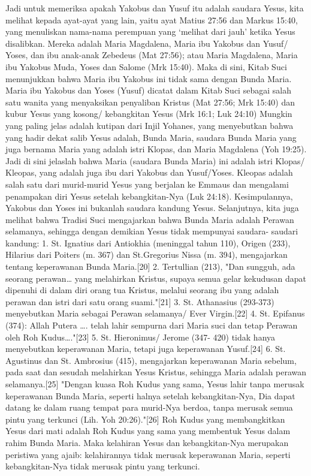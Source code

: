 Jadi untuk memeriksa apakah Yakobus dan Yusuf itu adalah saudara Yesus, kita melihat kepada ayat-ayat yang lain, yaitu ayat Matius 27:56 dan Markus 15:40, yang menuliskan nama-nama perempuan yang ‘melihat dari jauh’ ketika Yesus disalibkan. Mereka adalah Maria Magdalena, Maria ibu Yakobus dan Yusuf/ Yoses, dan ibu anak-anak Zebedeus (Mat 27:56); atau Maria Magdalena, Maria ibu Yakobus Muda, Yoses dan Salome (Mrk 15:40). Maka di sini, Kitab Suci menunjukkan bahwa Maria ibu Yakobus ini tidak sama dengan Bunda Maria. Maria ibu Yakobus dan Yoses (Yusuf) dicatat dalam Kitab Suci sebagai salah satu wanita yang menyaksikan penyaliban Kristus (Mat 27:56; Mrk 15:40) dan kubur Yesus yang kosong/ kebangkitan Yesus (Mrk 16:1; Luk 24:10)
Mungkin yang paling jelas adalah kutipan dari Injil Yohanes, yang menyebutkan bahwa yang hadir dekat salib Yesus adalah, Bunda Maria, saudara Bunda Maria yang juga bernama Maria yang adalah istri  Klopas, dan Maria Magdalena (Yoh 19:25). Jadi di sini jelaslah bahwa Maria (saudara Bunda Maria) ini adalah istri Klopas/ Kleopas, yang adalah juga ibu dari Yakobus dan Yusuf/Yoses. Kleopas adalah salah satu dari murid-murid Yesus yang berjalan ke Emmaus dan mengalami penampakan diri Yesus setelah kebangkitan-Nya (Luk 24:18).
Kesimpulannya, Yakobus dan Yoses ini bukanlah saudara kandung Yesus.
Selanjutnya, kita juga melihat bahwa Tradisi Suci mengajarkan bahwa Bunda Maria adalah Perawan selamanya, sehingga dengan demikian Yesus tidak mempunyai saudara- saudari kandung:
1.    St. Ignatius dari Antiokhia (meninggal tahun 110), Origen (233), Hilarius dari Poiters (m. 367) dan St.Gregorius Nissa (m. 394), mengajarkan tentang keperawanan Bunda Maria.[20]
2.    Tertullian (213), "Dan sungguh, ada seorang perawan… yang melahirkan Kristus, supaya semua gelar kekudusan dapat dipenuhi di dalam diri orang tua Kristus, melalui seorang ibu yang adalah perawan dan istri dari satu orang suami."[21]
3.    St. Athanasius (293-373) menyebutkan Maria sebagai Perawan selamanya/ Ever Virgin.[22]
4.    St. Epifanus (374): Allah Putera …. telah lahir sempurna dari Maria suci dan tetap Perawan oleh Roh Kudus…."[23]
5.    St. Hieronimus/ Jerome (347- 420) tidak hanya menyebutkan keperawanan Maria, tetapi juga keperawanan Yusuf.[24]
6.    St. Agustinus dan St. Ambrosius (415), mengajarkan keperawanan Maria sebelum, pada saat dan sesudah melahirkan Yesus Kristus, sehingga Maria adalah perawan selamanya.[25]
"Dengan kuasa Roh Kudus yang sama, Yesus lahir tanpa merusak keperawanan Bunda Maria, seperti halnya setelah kebangkitan-Nya, Dia dapat datang ke dalam ruang tempat para murid-Nya berdoa, tanpa merusak semua pintu yang terkunci (Lih. Yoh 20:26)."[26] Roh Kudus yang membangkitkan Yesus dari mati adalah Roh Kudus yang sama yang membentuk Yesus dalam rahim Bunda Maria. Maka kelahiran Yesus dan kebangkitan-Nya merupakan peristiwa yang ajaib: kelahirannya tidak merusak keperawanan Maria, seperti kebangkitan-Nya tidak merusak pintu yang terkunci.
